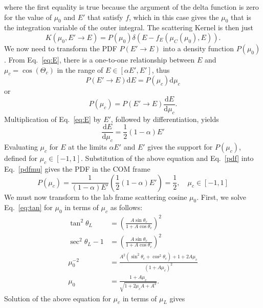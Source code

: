\documentclass[12pt]{article}
\renewcommand{\d}{\mathrm{d}}
\newcommand{\ra}{\rightarrow}
\newenvironment{solution}[1][Solution]{\begin{trivlist}
\item[\hskip \labelsep {\bfseries #1} {\hspace{-0.2em}\bfseries:}]\hspace{0.3in}\newline}{\end{trivlist}}
\begin{document}
\begin{solution}
 where the first equality is true because the argument of the delta function is zero
 for the value of $\mu_0$ and $E'$ that satisfy $f$, which in this case gives the
 $\mu_0$ that is the integration variable of the
 outer integral.  The scattering Kernel is then just
 \begin{equation}
     K(\mu_0,E'\ra E) = P(\mu_0)\delta(E - f_{E}(\mu_C(\mu_0),E)).  
 \end{equation}
 We now need to transform the PDF $P(E'\ra E)$ into a density function
 $P(\mu_0)$.  From Eq.~\eqref{eq:E},
 there is a one-to-one relationship between $E$ and $\mu_c=\cos(\Theta_c)$ in the
 range of $E\in[\alpha E',E']$, thus
 \begin{equation}
  P(E'\ra E) \d E = P(\mu_c)\d \mu_c
 \end{equation}
or
 \begin{equation} \label{pdfmu}
     P(\mu_c) = P(E' \ra E) \frac{\d E}{\d \mu_c} .
 \end{equation}
 Multiplication of Eq.~\eqref{eq:E} by $E'$, followed by differentiation, yields
 \begin{equation}
     \frac{ \d E}{\d \mu_c} = \frac{1}{2}(1-\alpha) E'
 \end{equation}
 Evaluating $\mu_c$ for $E$ at the limits $\alpha E'$
 and $E'$ gives the support for $P(\mu_c)$, defined for $\mu_c \in[ -1,1 ]$.  
 Substitution of the above equation and Eq.~\eqref{pdf} into Eq.~\eqref{pdfmu} gives
 the PDF in the COM frame
 \begin{equation}\label{eq:pdfc}
     P(\mu_c) = \frac{1}{(1-\alpha)E'} \left( \frac{1}{2}(1-\alpha)E' \right) =
     \frac{1}{2}, \quad \mu_c \in [-1,1]
 \end{equation}
 We must now transform to the lab frame scattering cosine $\mu_0$.  First, we solve
 Eq.~\eqref{eq:tan} for $\mu_0$ in terms of $\mu_c$ as follows:
 \begin{align}
  \tan^2\theta_L &= \left(\frac{A\sin \theta_c}{1 + A\cos \theta_c}\right)^2 \\
  \sec^2\theta_L - 1&= \left(\frac{A\sin \theta_c}{1 + A\cos \theta_c}\right)^2\\
  \mu_0^{-2} &= \frac{A^2(\sin^2\theta_c + \cos^2\theta_c) + 1 + 2A\mu_c}{\left(1+A\mu_c\right)^2}\\
  \mu_0 &= \frac{1+A\mu_c}{\sqrt{1+2\mu_cA+A^2}}. \label{eq:mul}
 \end{align}
Solution of the above equation for $\mu_c$ in terms of $\mu_L$ gives
\begin{equation}\label{eq:muc}

\end{equation}
\end{solution}
\end{document}
